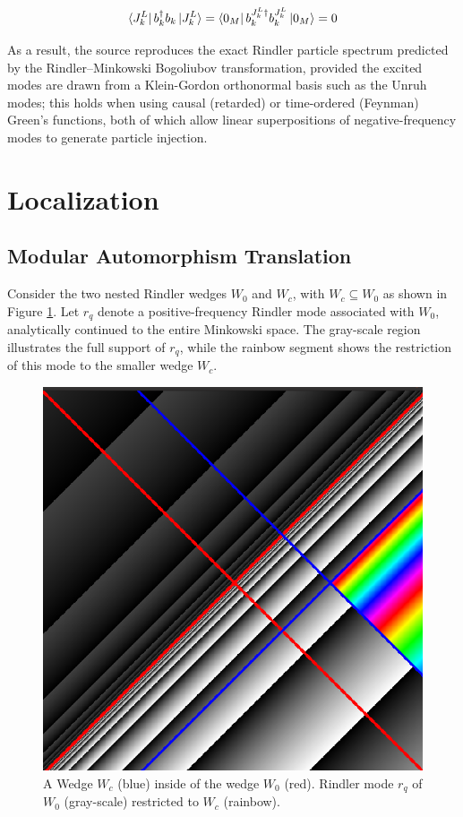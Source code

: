 \documentclass[12pt,a4paper]{article}
\begin{document}
\begin{equation}
  \bra{J_k^L}  b_k^{\dagger} b_k \ket{J_k^L} = \bra{0_M}  b_k^{J_k^L \dagger} b^{J_k^L}_k \ket{0_M} = 0
\end{equation}

As a result, the source reproduces the exact Rindler particle spectrum predicted by the Rindler–Minkowski Bogoliubov transformation, provided the excited modes are drawn from a Klein-Gordon orthonormal basis such as the Unruh modes; this holds when using causal (retarded) or time-ordered (Feynman) Green’s functions, both of which allow linear superpositions of negative-frequency modes to generate particle injection.

\section{Localization}
\subsection{Modular Automorphism \textemdash{} Translation}

Consider the two nested Rindler wedges $W_0$ and $W_c$, with $W_c \subseteq W_0$ as shown in Figure \ref{restrict}. Let $r_q$ denote a positive-frequency Rindler mode associated with $W_0$, analytically continued to the entire Minkowski space. The gray-scale region illustrates the full support of $r_q$, while the rainbow segment shows the restriction of this mode to the smaller wedge $W_c$.

\begin{figure}[h]
  \centering
\includegraphics[scale=0.3]{wedge_in_wedge.png}
\caption{A Wedge $W_c$ (blue) inside of the wedge $W_0$ (red). Rindler mode $r_q$ of $W_0$ (gray-scale) restricted to $W_c$ (rainbow).}
\label{restrict}
\end{figure}
\end{document}
